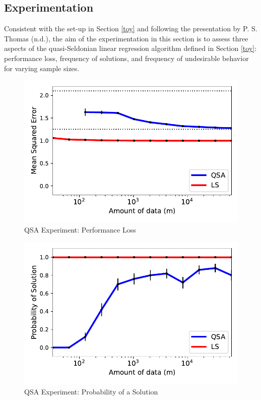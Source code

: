 \documentclass[12pt, twoside]{amherstthesis}
\begin{document}
\hypertarget{exp}{%
\subsection{Experimentation}\label{exp}}

Consistent with the set-up in Section \ref{toy} and following the presentation by P. S. Thomas (n.d.), the aim of the experimentation in this section is to assess three aspects of the quasi-Seldonian linear regression algorithm defined in Section \ref{toy}: performance loss, frequency of solutions, and frequency of undesirable behavior for varying sample sizes.
\begin{figure}

{\centering \includegraphics{Dasha-Asienga_StatThesis_files/figure-latex/fig4-1} 

}

\caption{QSA Experiment: Performance Loss}\label{fig:fig4}
\end{figure}
\begin{figure}

{\centering \includegraphics{Dasha-Asienga_StatThesis_files/figure-latex/fig5-3} 

}

\caption{QSA Experiment: Probability of a Solution}\label{fig:fig5}
\end{figure}
\end{document}
